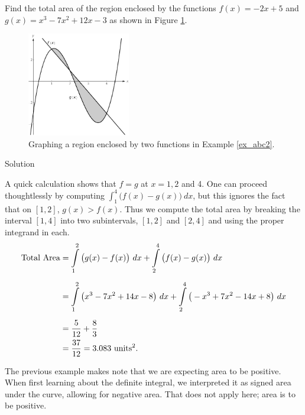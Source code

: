 \begin{example}\label{ex_abc2}
Find the total area of the region enclosed by the functions $f(x) = -2x+5$ and \\ $g(x) = x^3-7x^2+12x-3$ as shown in Figure \ref{fig_int_app_2}.


\begin{figure}[H]
	\begin{center}
			\includegraphics[width=0.4\textwidth]{fig_int_app_2}
	\caption{Graphing a region enclosed by two functions in Example \ref{ex_abc2}.}
	\label{fig_int_app_2}
	\end{center}
\end{figure}

Solution 

A quick calculation shows that $f=g$ at $x=1, 2$ and 4. One can proceed thoughtlessly by computing $ \int_1^4\big(f(x)-g(x)\big)\ dx$, but this ignores the fact that on $[1,2]$, $g(x)>f(x)$.  Thus we compute the total area by breaking the interval $[1,4]$ into two subintervals, $[1,2]$ and $[2,4]$ and using the proper integrand in each.
\begin{align*}
\text{Total Area} &= \displaystyle\int\limits_1^2 \big(g(x)-f(x)\big)\ dx + \displaystyle\int\limits_2^4\big(f(x)-g(x)\big)\ dx\\[0.2cm]
			&= \displaystyle\int\limits_1^2 \big(x^3-7x^2+14x-8\big) \ dx + \displaystyle\int\limits_2^4\big(-x^3+7x^2-14x+8\big)\ dx\\[0.2cm]
			&= \dfrac{5}{12} + \dfrac{8}{3} \\
			&= \dfrac{37}{12} = 3.083\ \text{units}^2.
\end{align*}		
\end{example}

The previous example makes note that we are expecting area to be positive. When first learning about the definite integral, we interpreted it as signed area under the curve, allowing for negative area. That does not apply here; area is to be positive.

